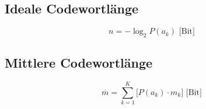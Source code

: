 \begin{multicols}{2}
\subsection*{Ideale Codewortlänge}
\[
    n = -\log_2{P(a_k)} \mbox{ [Bit]}
\]

\subsection*{Mittlere Codewortlänge}
\[
    \overline{m} = 
        \sum_{k=1}^{K} \bigg[ P(a_k) 
        \cdot m_k \bigg] \mbox{ [Bit]}
\]

\end{multicols}
